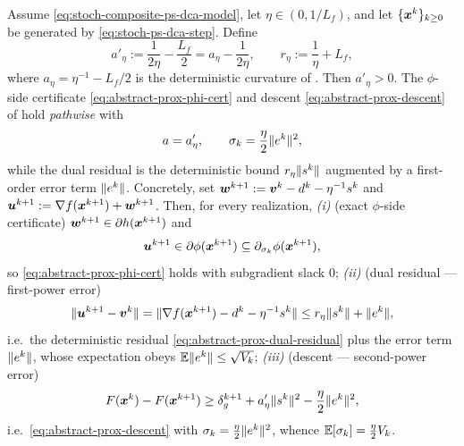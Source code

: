 \begin{lemma}
\label{lem:stoch-ps-dca-realization}
Assume \eqref{eq:stoch-composite-ps-dca-model}, let $\eta\in(0,1/L_f)$, and
let $\{\bm{x}^k\}_{k\ge0}$ be generated by \eqref{eq:stoch-ps-dca-step}.
Define
\[
    a'_\eta:=\frac1{2\eta}-\frac{L_f}{2}
    =a_\eta-\frac1{2\eta},
    \qquad
    r_\eta:=\frac1\eta+L_f ,
\]
where $a_\eta=\eta^{-1}-L_f/2$ is the deterministic curvature of
. Then $a'_\eta>0$. The $\phi$-side
certificate \eqref{eq:abstract-prox-phi-cert} and descent
\eqref{eq:abstract-prox-descent} of
 hold \emph{pathwise} with
\[
    a=a'_\eta,
    \qquad
    \sigma_k=\frac\eta2\lVert e^k\rVert^2,
\]
while the dual residual is the deterministic bound $r_\eta\lVert s^k\rVert$
augmented by a first-order error term $\lVert e^k\rVert$.
Concretely, set
$\bm{w}^{k+1}:=\bm{v}^k-d^k-\eta^{-1}s^k$ and
$\bm{u}^{k+1}:=\nabla f(\bm{x}^{k+1})+\bm{w}^{k+1}$. Then, for every realization,
\emph{(i)} \textup{(exact $\phi$-side certificate)}
$\bm{w}^{k+1}\in\partial h(\bm{x}^{k+1})$ and
\[
    \bm{u}^{k+1}
    \in
    \partial\phi(\bm{x}^{k+1})
    \subseteq
    \partial_{\sigma_k}\phi(\bm{x}^{k+1}),
\]
so \eqref{eq:abstract-prox-phi-cert} holds with subgradient slack $0$;
\emph{(ii)} \textup{(dual residual --- first-power error)}
\begin{equation}
    \lVert \bm{u}^{k+1}-\bm{v}^k\rVert
    =
    \lVert \nabla f(\bm{x}^{k+1})-d^k-\eta^{-1}s^k\rVert
    \le
    r_\eta\lVert s^k\rVert+\lVert e^k\rVert,
    \label{eq:stoch-ps-dca-residual}
\end{equation}
i.e.\ the deterministic residual \eqref{eq:abstract-prox-dual-residual}
plus the error term $\lVert e^k\rVert$, whose expectation obeys
$\mathbb{E}\lVert e^k\rVert\le\sqrt{V_k}$;
\emph{(iii)} \textup{(descent --- second-power error)}
\begin{equation}
    F(\bm{x}^k)-F(\bm{x}^{k+1})
    \ge
    \delta_g^{k+1}
    +a'_\eta\lVert s^k\rVert^2
    -\frac\eta2\lVert e^k\rVert^2,
    \label{eq:stoch-ps-dca-descent}
\end{equation}
i.e.\ \eqref{eq:abstract-prox-descent} with
$\sigma_k=\tfrac\eta2\lVert e^k\rVert^2$, whence
$\mathbb{E}[\sigma_k]=\tfrac\eta2 V_k$.
\end{lemma}

